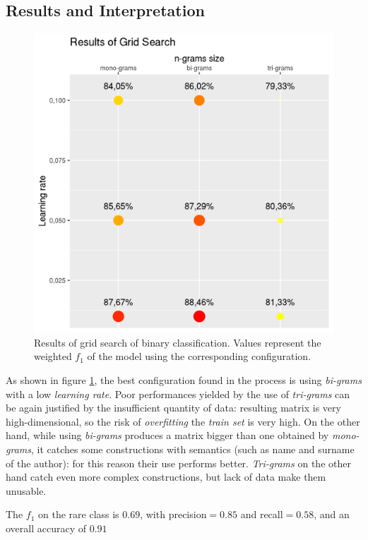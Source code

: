\documentclass[fleqn,10pt]{SelfArx}
\begin{document}
\subsection{Results and Interpretation}
\begin{figure}[!h]
    \includegraphics[width=\linewidth]{binary_class_grid_search.png}
    \caption{Results of grid search of binary classification. Values represent the weighted $f_1$ of the model using the corresponding configuration.}
    \label{fig:grid_search_binary}
\end{figure}
As shown in figure \ref{fig:grid_search_binary}, the best configuration found in the process is using \textit{bi-grams} with a low \textit{learning rate}.
Poor performances yielded by the use of \textit{tri-grams} can be again justified by the insufficient quantity of data: resulting matrix is very high-dimensional, so the risk of \textit{overfitting} the \textit{train set} is very high.
On the other hand, while using \textit{bi-grams} produces a matrix bigger than one obtained by \textit{mono-grams}, it catches some constructions with semantics (such as name and surname of the author): for this reason their use performs better.
\textit{Tri-grams} on the other hand catch even more complex constructions, but lack of data make them unusable.

The $f_1$ on the rare class is $0.69$, with precision$=0.85$ and recall$=0.58$, and an overall accuracy of $0.91$
\end{document}
